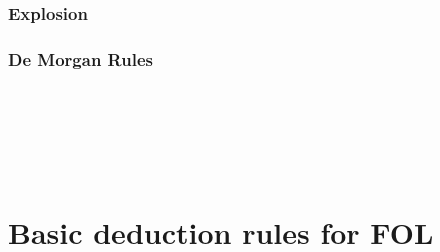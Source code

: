 \begin{multicols}{2}
\subsubsection*{Explosion}
	\begin{pf}
	 
	\end{pf}


%
%

\subsubsection*{De Morgan Rules}
\begin{pf}

\\	

\\	

\\	
\end{pf}
\end{multicols}

\newpage

\section{Basic deduction rules for FOL}

